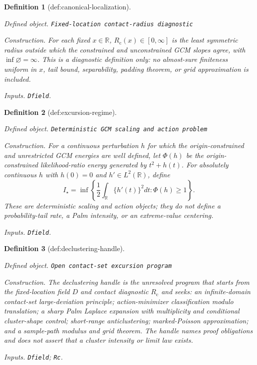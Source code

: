 \documentclass{article}
\newtheorem{definition}{Definition}
\begin{document}
\begin{definition}[def:canonical-localization]\label{def:canonical-localization}
\par\smallskip\noindent\emph{Defined object.} \texttt{Fixed-\allowbreak{}location contact-\allowbreak{}radius diagnostic}
\par\smallskip\noindent\emph{Construction.} For each fixed \(x\in\mathbb R\), \(R_{\mathrm c}(x)\in[0,\infty]\) is the least symmetric radius outside which the constrained and unconstrained GCM slopes agree, with \(\inf\varnothing=\infty\). This is a diagnostic definition only: no almost-sure finiteness uniform in \(x\), tail bound, separability, padding theorem, or grid approximation is included.
\par\smallskip\noindent\emph{Inputs.} \texttt{Dfield}.
\end{definition}

\begin{definition}[def:excursion-regime]\label{def:excursion-regime}
\par\smallskip\noindent\emph{Defined object.} \texttt{Deterministic GCM scaling and action problem}
\par\smallskip\noindent\emph{Construction.} For a continuous perturbation \(h\) for which the origin-constrained and unrestricted GCM energies are well defined, let \(\Phi(h)\) be the origin-constrained likelihood-ratio energy generated by \(t^2+h(t)\). For absolutely continuous \(h\) with \(h(0)=0\) and \(h'\in L^2(\mathbb R)\), define
\[
 I_\star=\inf\left\{\frac12\int_{\mathbb R}\{h'(t)\}^2dt:\Phi(h)\ge1\right\}.
\]
These are deterministic scaling and action objects; they do not define a probability-tail rate, a Palm intensity, or an extreme-value centering.
\par\smallskip\noindent\emph{Inputs.} \texttt{Dfield}.
\end{definition}

\begin{definition}[def:declustering-handle]\label{def:declustering-handle}
\par\smallskip\noindent\emph{Defined object.} \texttt{Open contact-\allowbreak{}set excursion program}
\par\smallskip\noindent\emph{Construction.} The declustering handle is the unresolved program that starts from the fixed-location field \(D\) and contact diagnostic \(R_{\mathrm c}\) and seeks: an infinite-domain contact-set large-deviation principle; action-minimizer classification modulo translation; a sharp Palm Laplace expansion with multiplicity and conditional cluster-shape control; short-range anticlustering; marked-Poisson approximation; and a sample-path modulus and grid theorem. The handle names proof obligations and does not assert that a cluster intensity or limit law exists.
\par\smallskip\noindent\emph{Inputs.} \texttt{Dfield}; \texttt{Rc}.
\end{definition}
\end{document}
